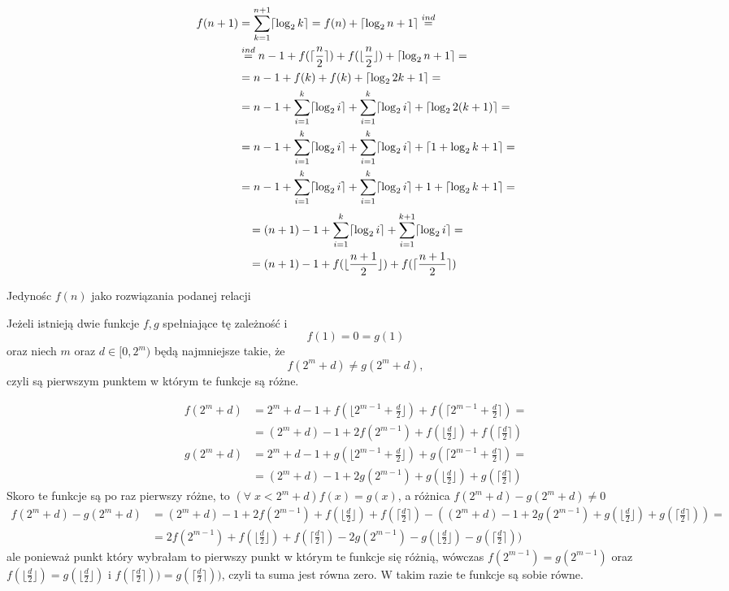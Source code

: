 \documentclass{article}[13pt]
\begin{document}
    \begin{align*}
        f(n+1)&=\sum\limits_{k=1}^{n+1}\lceil\log_2k\rceil=f(n)+\lceil\log_2n+1\rceil\overset{ind}{=}\\
        &\overset{ind}{=}n-1+f(\lceil{n\over2}\rceil)+f(\lfloor{n\over2}\rfloor)+\lceil\log_2n+1\rceil=\\
        &=n-1+f(k)+f(k)+\lceil\log_22k+1\rceil=\\
        &=n-1+\sum\limits_{i=1}^{k}\lceil\log_2i\rceil+\sum\limits_{i=1}^k\lceil\log_2i\rceil+\lceil\log_22(k+1)\rceil=\\
        &=n-1+\sum\limits_{i=1}^{k}\lceil\log_2i\rceil+\sum\limits_{i=1}^k\lceil\log_2i\rceil+\lceil1+\log_2k+1\rceil=\\
        &=n-1+\sum\limits_{i=1}^{k}\lceil\log_2i\rceil+\sum\limits_{i=1}^k\lceil\log_2i\rceil+1+\lceil\log_2k+1\rceil=
    \end{align*}
    \begin{align*}
        &=(n+1)-1+\sum\limits_{i=1}^{k}\lceil\log_2i\rceil+\sum\limits_{i=1}^{k+1}\lceil\log_2i\rceil=\\
        &=(n+1)-1+f(\lfloor{n+1\over2}\rfloor)+f(\lceil{n+1\over2}\rceil)
    \end{align*}

    {\color{acc}Jedynośc $f(n)$ jako rozwiązania podanej relacji}
    \medskip

    Jeżeli istnieją dwie funkcje $f,g$ spełniające tę zależność i
    $$f(1)=0=g(1)$$
    oraz niech $m$ oraz $d\in[0, 2^m)$ będą najmniejsze takie, że
    $$f(2^m+d)\neq g(2^m+d),$$
    czyli są pierwszym punktem w którym te funkcje są różne.

    \begin{align*}
        f(2^m+d)&=2^m+d-1+f(\lfloor 2^{m-1}+\frac d2\rfloor)+f(\lceil2^{m-1}+\frac d2\rceil)=\\
        &=(2^m+d)-1+2f(2^{m-1})+f(\lfloor \frac d2\rfloor)+f(\lceil\frac d2\rceil)
    \end{align*}
    \begin{align*}
        g(2^m+d)&=2^m+d-1+g(\lfloor 2^{m-1}+\frac d2\rfloor)+g(\lceil2^{m-1}+\frac d2\rceil)=\\
        &=(2^m+d)-1+2g(2^{m-1})+g(\lfloor \frac d2\rfloor)+g(\lceil\frac d2\rceil)
    \end{align*}
    Skoro te funkcje są po raz pierwszy różne, to $(\forall\;x<2^m+d)f(x)=g(x)$, a różnica $f(2^m+d)-g(2^m+d)\neq0$
    \begin{align*}
        f(2^m+d)-g(2^m+d)&=(2^m+d)-1+2f(2^{m-1})+f(\lfloor \frac d2\rfloor)+f(\lceil\frac d2\rceil)-((2^m+d)-1+2g(2^{m-1})+g(\lfloor \frac d2\rfloor)+g(\lceil\frac d2\rceil))=\\
        &=2f(2^{m-1})+f(\lfloor \frac d2\rfloor)+f(\lceil\frac d2\rceil)-2g(2^{m-1})-g(\lfloor \frac d2\rfloor)-g(\lceil\frac d2\rceil))
    \end{align*}
    ale ponieważ punkt który wybrałam to pierwszy punkt w którym te funkcje się różnią, wówczas $f(2^{m-1})=g(2^{m-1})$ oraz $f(\lfloor \frac d2\rfloor)=g(\lfloor \frac d2\rfloor)$ i $f(\lceil\frac d2\rceil))=g(\lceil\frac d2\rceil))$, czyli ta suma jest równa zero. W takim razie te funkcje są sobie równe.
\end{document}

